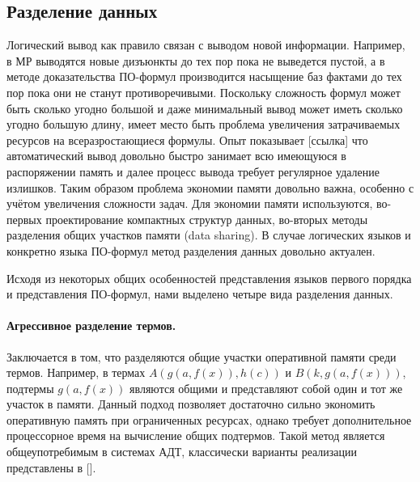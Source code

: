 \subsection{Разделение данных}
Логический вывод как правило связан с выводом новой информации. Например, в МР выводятся новые дизъюнкты до тех пор пока не выведется пустой, а в методе доказательства ПО-формул производится насыщение баз фактами до тех пор пока они не станут противоречивыми. Поскольку сложность формул может быть сколько угодно большой и даже минимальный вывод может иметь сколько угодно большую длину, имеет место быть проблема увеличения затрачиваемых ресурсов на всеразростающиеся формулы. Опыт показывает [ссылка] что автоматический вывод довольно быстро занимает всю имеющуюся в распоряжении память и далее процесс вывода требует регулярное удаление излишков. Таким образом проблема экономии памяти  довольно важна, особенно с учётом увеличения сложности задач. Для экономии памяти используются, во-первых проектирование компактных структур данных, во-вторых методы разделения общих участков памяти (data sharing). В случае логических языков и конкретно языка ПО-формул метод разделения данных довольно актуален.

Исходя из некоторых общих особенностей представления языков первого порядка и представления ПО-формул, нами выделено четыре вида разделения данных.

\paragraph{Агрессивное разделение термов.} Заключается в том, что разделяются общие участки оперативной памяти среди термов. Например, в термах $A(g(a,f(x)),h(c))$ и $B(k,g(a,f(x)))$, подтермы $g(a,f(x))$ являются общими и представляют собой один и тот же участок в памяти. Данный подход позволяет достаточно сильно экономить оперативную память при ограниченных ресурсах, однако требует дополнительное процессорное время на вычисление общих подтермов. Такой метод является общеупотребимым в системах АДТ, классически варианты реализации представлены в [].

